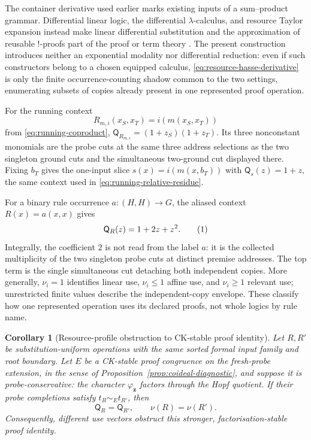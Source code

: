 \documentclass[10pt,a4paper]{article}
\theoremstyle{plain}
\newtheorem{corollary}[theorem]{Corollary}
\theoremstyle{definition}
\theoremstyle{remark}
\newcommand{\eqtag}{\refstepcounter{equation}\tag{\theequation}}
\begin{document}
The container derivative used earlier marks existing inputs of a
sum--product grammar.  Differential linear logic, the differential
\(\lambda\)-calculus, and resource Taylor expansion instead make linear
differential substitution and the approximation of reusable
\(!\)-proofs part of the proof or term theory
\cite{ehrhardregnier2003,ehrhardregnier2006,ehrhardregnier2008,
ehrhard2018dll}.  The present construction introduces neither an
exponential modality nor differential reduction: even if such constructors
belong to a chosen equipped calculus,
\eqref{eq:resource-hasse-derivative} is only the finite
occurrence-counting shadow common to the two settings, enumerating subsets
of copies already present in one represented proof operation.

For the running context
\[
          R_{m,i}(x_S,x_T)=i(m(x_S,x_T))
\]
from \eqref{eq:running-coproduct},
\(
\mathsf Q_{R_{m,i}}=(1+z_S)(1+z_T)
\).
Its three nonconstant monomials are the probe cuts at the same three address
selections as the two singleton ground cuts and the simultaneous two-ground
cut displayed there.  Fixing \(b_T\) gives the
one-input slice \(s(x)=i(m(x,b_T))\) with
\(\mathsf Q_s(z)=1+z\), the same context used in
\eqref{eq:running-relative-residue}.

For a binary rule occurrence \(a:(H,H)\to G\), the aliased context
\(R(x)=a(x,x)\) gives
\[
                 \mathsf Q_R(z)=1+2z+z^2.
\eqtag\label{eq:resource-copying-example}
\]
Integrally, the coefficient \(2\) is not read from the label \(a\): it is
the collected multiplicity of the two singleton probe cuts at distinct
premise addresses.
The top term is the single simultaneous cut detaching both independent
copies.  More generally, \(\nu_i=1\) identifies linear use,
\(\nu_i\le1\) affine use, and \(\nu_i\ge1\) relevant use; unrestricted
finite values describe the independent-copy envelope.  These classify how
one represented operation uses its declared proofs, not whole logics by
rule name.

\begin{corollary}[Resource-profile obstruction to CK-stable proof identity]
\label{cor:resource-profile-obstruction}
Let \(R,R'\) be substitution-uniform operations with the same sorted
formal input family and root boundary.  Let \(E\) be a CK-stable proof
congruence on the fresh-probe extension, in the sense of
Proposition~\ref{prop:coideal-diagnostic}, and suppose it is
\emph{probe-conservative}: the character \(\varphi_{\mathbf z}\) factors
through the Hopf quotient.  If their probe completions satisfy
\(t_R\sim_Et_{R'}\), then
\[
             \mathsf Q_R=\mathsf Q_{R'},
             \qquad \nu(R)=\nu(R').
\]
Consequently, different use vectors obstruct this stronger,
factorisation-stable proof identity.
\end{corollary}
\end{document}
